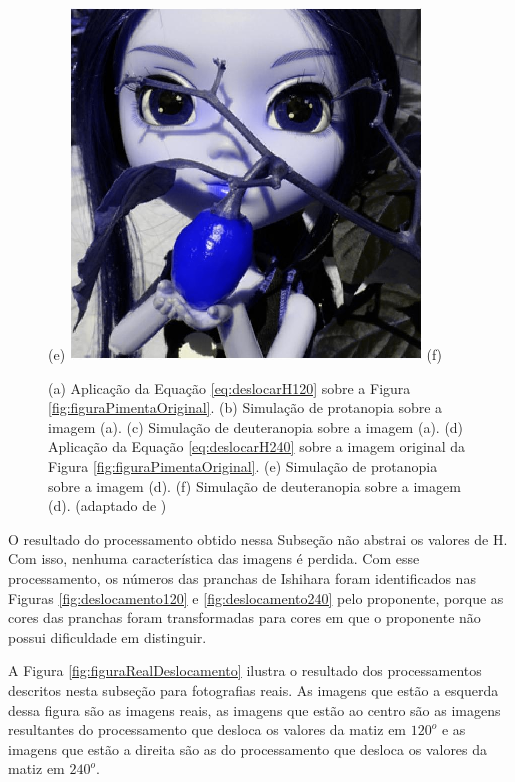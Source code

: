 \documentclass[	12pt, Times, openright, twoside, a4paper, english, brazil]{abntex2}
\begin{document}
\begin{figure}[!htb]
(e)
\endminipage\hfill
{}
\centering
{\includegraphics[width=\linewidth]{figuraPimenta240Deutran.png}}
(f)
\endminipage\hfill
\caption{
(a) Aplicação da Equação \ref{eq:deslocarH120} sobre a Figura \ref{fig:figuraPimentaOriginal}. (b) Simulação de protanopia sobre a imagem (a). (c) Simulação de deuteranopia sobre a imagem (a). (d) Aplicação da Equação \ref{eq:deslocarH240} sobre a imagem original da Figura \ref{fig:figuraPimentaOriginal}. (e) Simulação de protanopia sobre a imagem (d).
(f) Simulação de deuteranopia sobre a imagem (d). (adaptado de )}
\label{fig:figuraSimulacaoH}
\end{figure}

O resultado do processamento obtido nessa Subseção não abstrai os valores de H. Com isso, nenhuma característica das imagens é perdida. Com esse processamento, os números das pranchas de Ishihara foram identificados nas Figuras \ref{fig:deslocamento120} e \ref{fig:deslocamento240} pelo proponente, porque as cores das pranchas foram transformadas para cores em que o proponente não possui dificuldade em distinguir.

A Figura \ref{fig:figuraRealDeslocamento} ilustra o resultado dos processamentos descritos nesta subseção para fotografias reais. As imagens que estão a esquerda dessa figura são as imagens reais, as imagens que estão ao centro são as imagens resultantes do processamento que desloca os valores da matiz em $120^o$ e as imagens que estão a direita são as do processamento que desloca os valores da matiz em $240^o$.
\end{document}
